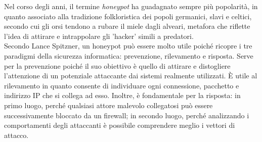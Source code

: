 Nel corso degli anni, il termine \textit{honeypot} ha guadagnato sempre più popolarità, in quanto associato alla tradizione folkloristica dei popoli germanici\cite{bear}, slavi e celtici, secondo cui gli orsi tendono a rubare il miele dagli alveari, metafora che riflette l'idea di attirare e intrappolare gli 'hacker' simili a predatori.\\
Secondo Lance Spitzner, un honeypot può essere molto utile poiché ricopre i tre paradigmi della sicurezza informatica: prevenzione, rilevamento e risposta. Serve per la prevenzione poiché il suo obiettivo è quello di attirare e distogliere l'attenzione di un potenziale attaccante dai sistemi realmente utilizzati. È utile al rilevamento in quanto consente di individuare ogni connessione, pacchetto e indirizzo IP che si collega ad esso. Inoltre, è fondamentale per la risposta: in primo luogo, perché qualsiasi attore malevolo collegatosi può essere successivamente bloccato da un firewall; in secondo luogo, perché analizzando i comportamenti degli attaccanti è possibile comprendere meglio i vettori di attacco\cite{spitzner}.\\

